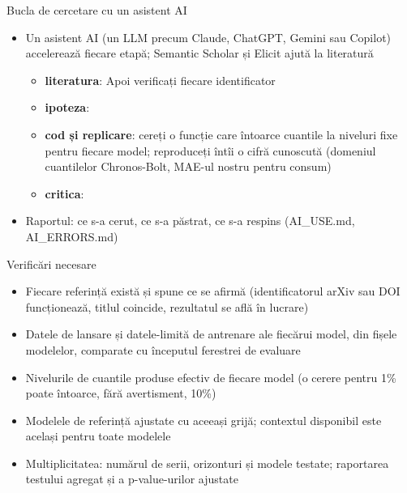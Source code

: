 \begin{frame}{Bucla de cercetare cu un asistent AI}
\itemsize{\footnotesize}
\begin{itemize}
    \item Un asistent AI (un LLM precum Claude, ChatGPT, Gemini sau Copilot) accelerează fiecare etapă; Semantic Scholar și Elicit ajută la literatură
    \begin{itemize}
        \item \textbf{literatura}:  Apoi verificați fiecare identificator
        \item \textbf{ipoteza}: 
        \item \textbf{cod și replicare}: cereți o funcție care întoarce cuantile la niveluri fixe pentru fiecare model; reproduceți întîi o cifră cunoscută (domeniul cuantilelor Chronos-Bolt, MAE-ul nostru pentru consum)
        \item \textbf{critica}: 
    \end{itemize}
    \item Raportul: ce s-a cerut, ce s-a păstrat, ce s-a respins (AI\_USE.md, AI\_ERRORS.md)
\end{itemize}
\end{frame}

\begin{frame}{Verificări necesare}
\itemsize{\small}
\begin{itemize}
    \item Fiecare referință există și spune ce se afirmă (identificatorul arXiv sau DOI funcționează, titlul coincide, rezultatul se află în lucrare)
    \item Datele de lansare și datele-limită de antrenare ale fiecărui model, din fișele modelelor, comparate cu începutul ferestrei de evaluare
    \item Nivelurile de cuantile produse efectiv de fiecare model (o cerere pentru 1\% poate întoarce, fără avertisment, 10\%)
    \item Modelele de referință ajustate cu aceeași grijă; contextul disponibil este același pentru toate modelele
    \item Multiplicitatea: numărul de serii, orizonturi și modele testate; raportarea testului agregat și a p-value-urilor ajustate
\end{itemize}
\end{frame}

